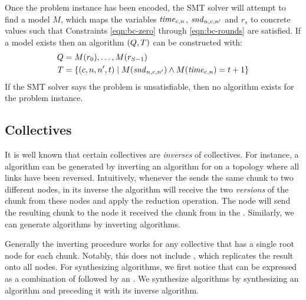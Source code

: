 Once the problem instance has been encoded, the SMT solver will attempt to find a model $M$, which maps the variables $\mathit{time}_{c,n}$, $\mathit{snd}_{n,c,n'}$ and $r_s$ to concrete values such that Constraints \ref{eqn:bc-zero} through \ref{eqn:bc-rounds} are satisfied. If a model exists then an algorithm $(Q, T)$ can be constructed with:
\begin{align*}
    Q&=M(r_0),\dotsc,M(r_{S-1}) \\
    T&=\{(c,n,n',t) \;|\; M(\mathit{snd}_{n,c,n'}) \wedge M(\mathit{time}_{c,n}) = t+1 \}
\end{align*}
If the SMT solver says the problem is unsatisfiable, then no algorithm exists for the problem instance.


\subsection{\reducingCap Collectives}
\label{sec:reduction}
It is well known that certain \reducing collectives are {\em inverses} of \broadcasting collectives. For instance, a \reduce algorithm can be generated by inverting an algorithm for \broadcast on a topology where all links have been reversed. Intuitively, whenever the \broadcast sends the same chunk to two different nodes, in its inverse the \reduce algorithm will receive the two {\em versions} of the chunk from these nodes and apply the reduction operation. The node will send the resulting chunk to the node it received the chunk from in the \broadcast. Similarly, we can generate \reducescatter algorithms by inverting \allgather algorithms. %

Generally the inverting procedure works for any \reducing collective that has a single root node for each chunk. Notably, this does not include \allreduce, which replicates the result onto all nodes. For synthesizing \allreduce algorithms, we first notice that \allreduce can be expressed as a combination of \reducescatter followed by an \allgather. We synthesize \allreduce algorithms by synthesizing an \allgather algorithm and preceding it with its inverse \reducescatter algorithm. 

